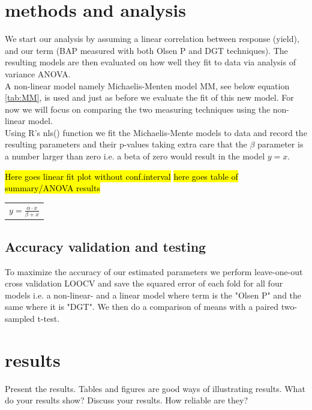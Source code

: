 \documentclass{article}
\begin{document}
\section{methods and analysis}
We start our analysis by assuming a linear correlation between response (yield), and our term (BAP measured with both Olsen P and DGT techniques). The resulting models are then evaluated on how well they fit to data via analysis of variance ANOVA. \\ A non-linear model namely Michaelis-Menten model MM, see below equation \ref{tab:MM}, is used and just as before we evaluate the fit of this new model.
For now we will focus on comparing the two measuring techniques using the non-linear model. \\ Using R's nls() function we fit the Michaelis-Mente models to data and record the resulting parameters and their p-values taking extra care that the $\beta$ parameter is a number larger than zero i.e. a beta of zero would result in the model $y = x$. 

\hl{Here goes linear fit plot without conf.interval}
\hl{here goes table of summary/ANOVA results}
\begin{minipage}{\linewidth}
	\centering
	\begin{tabular}{ c }
		\bf $y = \frac{\alpha \cdot x}{\beta + x}$  \\ 
		\end {tabular}\par
		\label{tab:MM}
\end{minipage} \bigskip



\subsection{Accuracy validation and testing}
To maximize the accuracy of our estimated parameters we perform leave-one-out cross validation LOOCV and save the squared error of each fold for all four  models i.e. a non-linear- and a linear model where term is the "Olsen P" and the same where it is "DGT". We then do a comparison of means with a paired two-sampled t-test.


\section{results}

Present the results.
Tables and figures are good ways of illustrating results.
What do your results show?
Discuss your results. How reliable are they?
\end{document}
